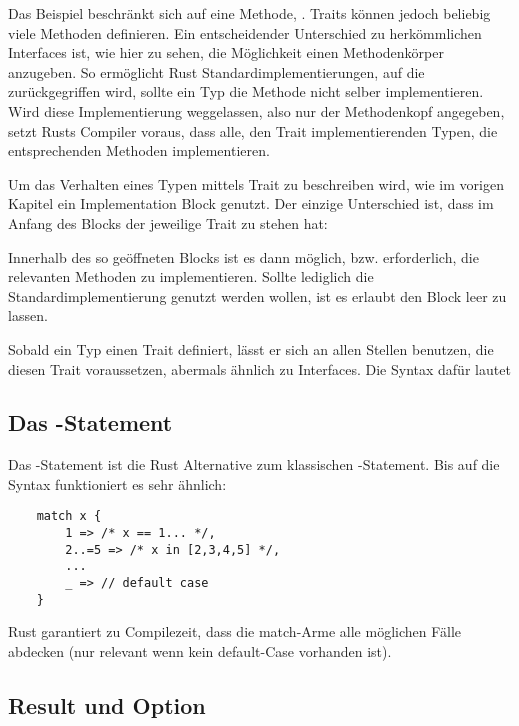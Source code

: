 Das Beispiel beschränkt sich auf eine Methode, . Traits können jedoch beliebig viele Methoden definieren. Ein entscheidender Unterschied zu herkömmlichen Interfaces ist, wie hier zu sehen, die Möglichkeit einen Methodenkörper anzugeben. So ermöglicht Rust Standardimplementierungen, auf die zurückgegriffen wird, sollte ein Typ die Methode nicht selber implementieren. Wird diese Implementierung weggelassen, also nur der Methodenkopf angegeben, setzt Rusts Compiler voraus, dass alle, den Trait implementierenden Typen, die entsprechenden Methoden implementieren.

Um das Verhalten eines Typen mittels Trait zu beschreiben wird, wie im vorigen Kapitel ein Implementation Block genutzt. Der einzige Unterschied ist, dass im Anfang des Blocks der jeweilige Trait zu stehen hat:


Innerhalb des so geöffneten Blocks ist es dann möglich, bzw. erforderlich, die relevanten Methoden zu implementieren. Sollte lediglich die Standardimplementierung genutzt werden wollen, ist es erlaubt den Block leer zu lassen.

Sobald ein Typ einen Trait definiert, lässt er sich an allen Stellen benutzen, die diesen Trait voraussetzen, abermals ähnlich zu Interfaces. Die Syntax dafür lautet 


\subsection{Das -Statement}

Das -Statement ist die Rust Alternative zum klassischen -Statement. Bis auf die Syntax funktioniert es sehr ähnlich:

\begin{verbatim}
    match x {
        1 => /* x == 1... */,
        2..=5 => /* x in [2,3,4,5] */,
        ...
        _ => // default case
    }
\end{verbatim}

Rust garantiert zu Compilezeit, dass die match-Arme alle möglichen Fälle abdecken (nur relevant wenn kein default-Case vorhanden ist).

\subsection{Result und Option}

